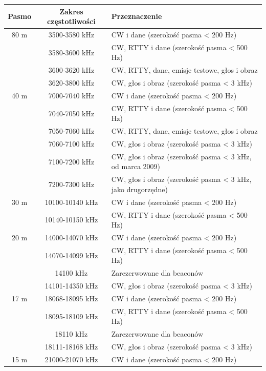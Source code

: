 \documentclass[a4paper,11pt]{article}
\begin{document}
\begin{center}
\begin{tabular}{| c | c | p{8cm} |}
\hline
\textbf{Pasmo} & \textbf{Zakres częstotliwości} & \textbf{Przeznaczenie} \\ \hline
80 m & 3500-3580 kHz & CW i dane (szerokość pasma < 200 Hz) \\ \cline{2-3}
 & 3580-3600 kHz & CW, RTTY i dane (szerokość pasma < 500 Hz) \\ \cline{2-3}
 & 3600-3620 kHz & CW, RTTY, dane, emisje testowe, głos i obraz \\ \cline{2-3}
 & 3620-3800 kHz & CW, głos i obraz (szerokość pasma < 3 kHz) \\ \hline
40 m & 7000-7040 kHz & CW i dane (szerokość pasma < 200 Hz) \\ \cline{2-3}
 & 7040-7050 kHz & CW, RTTY i dane (szerokość pasma < 500 Hz) \\ \cline{2-3}
 & 7050-7060 kHz & CW, RTTY, dane, emisje testowe, głos i obraz \\ \cline{2-3}
 & 7060-7100 kHz & CW, głos i obraz (szerokość pasma < 3 kHz) \\ \cline{2-3}
 & 7100-7200 kHz & CW, głos i obraz (szerokość pasma < 3 kHz, od marca 2009) \\ \cline{2-3}
 & 7200-7300 kHz & CW, głos i obraz (szerokość pasma < 3 kHz, jako drugorzędne) \\ \hline
30 m & 10100-10140 kHz & CW i dane (szerokość pasma < 200 Hz) \\ \cline{2-3}
 & 10140-10150 kHz & CW, RTTY i dane (szerokość pasma < 500 Hz) \\ \hline
20 m & 14000-14070 kHz & CW i dane (szerokość pasma < 200 Hz) \\ \cline{2-3}
 & 14070-14099 kHz & CW, RTTY i dane (szerokość pasma < 500 Hz) \\ \cline{2-3}
 & 14100 kHz & Zarezerwowane dla beaconów \\ \cline{2-3}
 & 14101-14350 kHz & CW, głos i obraz (szerokość pasma < 3 kHz) \\ \hline
17 m & 18068-18095 kHz & CW i dane (szerokość pasma < 200 Hz) \\ \cline{2-3}
 & 18095-18109 kHz & CW, RTTY i dane (szerokość pasma < 500 Hz) \\ \cline{2-3}
 & 18110 kHz & Zarezerwowane dla beaconów \\ \cline{2-3}
 & 18111-18168 kHz & CW, głos i obraz (szerokość pasma < 3 kHz) \\ \hline
15 m & 21000-21070 kHz & CW i dane (szerokość pasma < 200 Hz) \\ \cline{2-3}

\end{tabular}
\end{center}
\end{document}
